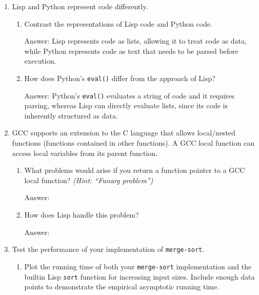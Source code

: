 \documentclass[12pt,letterpaper]{ntdhw}
\begin{document}
\begin{enumerate}
  \item Lisp and Python represent code differently.

  \begin{enumerate}
    \item Contrast the representations of Lisp code and Python code.

    \begin{emph}
      Answer: Lisp represents code as lists, allowing it to treat code as data, while Python represents code as text that needs to be parsed before execution.
    \end{emph}

    \item How does Python's {\tt eval()} differ from the approach of Lisp?

    \begin{emph}
      Answer:  Python’s {\tt eval()} evaluates a string of code and it requires parsing, whereas Lisp can directly evaluate lists, since its code is inherently structured as data.
    \end{emph}
  \end{enumerate}

  \item GCC supports an extension to the C language that allows
  local/nested functions (functions contained in other functions).  A
  GCC local function can access local variables from its parent
  function.
  \begin{enumerate}
    \item What problems would arise if you return a function pointer
    to a GCC local function? \emph{(Hint: ``Funarg problem'')}

    \begin{emph}
      Answer: %
    \end{emph}

    \item How does Lisp handle this problem?

    \begin{emph}
      Answer: %
    \end{emph}

  \end{enumerate}

  \item Test the performance of your implementation of
    \texttt{merge-sort}.
    \begin{enumerate}

    \item Plot the running time of both your \texttt{merge-sort}
      implementation and the builtin Lisp \texttt{sort} function for
      increasing input sizes.  Include enough data points to
      demonstrate the empirical asymptotic running time.


\end{enumerate}
\end{enumerate}
\end{document}
